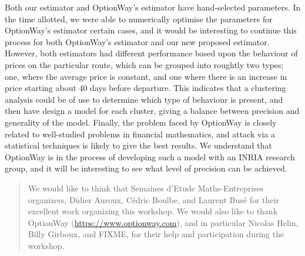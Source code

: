 \documentclass{article}
\begin{document}
Both our estimator and OptionWay's estimator have hand-selected
parameters.  In the time allotted, we were able to numerically
optimise the parameters for OptionWay's estimator certain cases, and
it would be interesting to continue this process for both OptionWay's
estimator and our new proposed estimator.  However, both estimators
had different performance based upon the behaviour of prices on the
particular route, which can be grouped into roughtly two types; one,
where the average price is constant, and one where there is an
increase in price starting about 40 days before departure.  This
indicates that a clustering analysis could be of use to determine
which type of behaviour is present, and then have design a model for
each cluster, giving a balance between precision and generality of the
model.  Finally, the problem faced by OptionWay is closely related to
well-studied problems in financial mathematics, and attack via a
statistical techniques is likely to give the best results.  We
understand that OptionWay is in the process of developing such a model
with an INRIA research group, and it will be interesting to see what level
of precision can be achieved.

\renewcommand{\abstractname}{Acknowledgements}
\begin{abstract}
  We would like to think that Semaines d'Etude Maths-Entreprises
  organizers, Didier Auroux, C\'edric Boulbe, and Laurent Busé for their
  excellent work organizing this workshop.  We would also like to
  thank OptionWay (\url{https://www.optionway.com}), and in particular
  Nicolas Helin, Billy Girboux, and FIXME, for their help and
  participation during the workshop.
\end{abstract}
\end{document}
